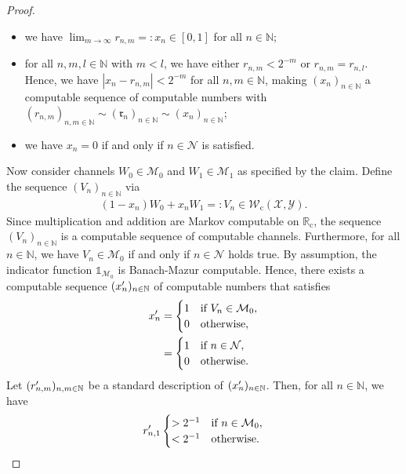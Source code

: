 \documentclass[conference]{IEEEtran}
\def\X{{\mathcal X}}
\def\Y{{\mathcal Y}}
\def\M{{\mathcal M}}
\def\N{{\mathcal N}}
\def\W{{\mathcal W}}
\def\NN{{\mathbb N}}
\def\RR{{\mathbb R}}
\newcommand{\RRc}{\RR_{\mathrm{c}}}
\newcommand{\xp}[1]{\mathrlap{\phantom{x}^{\prime}}x_{#1}}
\newcommand{\rp}[1]{\mathrlap{\phantom{r}^{\prime}}r_{#1}}
\newcommand{\Wc}{\W_{\mathrm{c}}}
\begin{document}
\begin{proof}
					\begin{itemize}	\item	we have \(\lim_{m\to\infty} r_{n,m} =: x_n \in [0,1]\) for all \(n\in \NN\);
									\item	for all \(n,m,l\in\NN\) with \(m < l\), we have either \(r_{n,m} < 2^{-m}\) or   
											\(r_{n,m} = r_{n,l}\). Hence, we have \(|x_n - r_{n,m}| < 2^{-m}\) for all \(n,m\in\NN\),
											making \((x_n)_{n\in\NN}\) a computable sequence of computable numbers with 
											\((r_{n,m})_{n,m\in\NN} \sim (\mathfrak{r}_{n})_{n\in\NN} \sim (x_n)_{n\in\NN}\);
									\item 	we have \(x_n = 0\) if and only if \(n\in\N\) is satisfied. 
					\end{itemize}   
					Now consider channels \(W_0\in\M_0\) and \(W_1\in\M_1\) as specified by the claim. Define the sequence \((V_n)_{n\in\NN}\) via
					\begin{align}	(1-x_n)W_0 + x_n W_1 =: V_n \in \Wc(\X,\Y).
					\end{align}
					Since multiplication and addition are Markov computable on \(\RRc\), the sequence \((V_n)_{n\in\NN}\) is a computable
					sequence of computable channels. Furthermore, for all \(n\in\NN\), we have \(V_n \in \M_0\) if and only if \(n\in\N\) holds true. 
					By assumption, the indicator function \(\mathds{1}_{\M_0}\) is Banach-Mazur computable. Hence, there exists a computable sequence
					\((\xp{n})_{n\in\NN}\) of computable numbers that satisfies
					\begin{align}	\xp{n}	&= 	\begin{cases}	1	&\text{if}~ V_n \in \M_0, \\
																0 	&\text{otherwise},
												\end{cases} \\
											&=	\begin{cases}	1	&\text{if}~ n \in \N, \\
																0 	&\text{otherwise}.
												\end{cases} 
					\end{align}
					Let \((\rp{n,m})_{n,m\in\NN}\) be a standard description of \((\xp{n})_{n\in\NN}\). Then, for all \(n\in\NN\), we have
					\begin{align}	\rp{n,1} 	\begin{cases}	> 2^{-1}	&\text{if}~ n \in \M_0, \\
																< 2^{-1} 	&\text{otherwise}.
												\end{cases} 

\end{align}
\end{proof}
\end{document}
